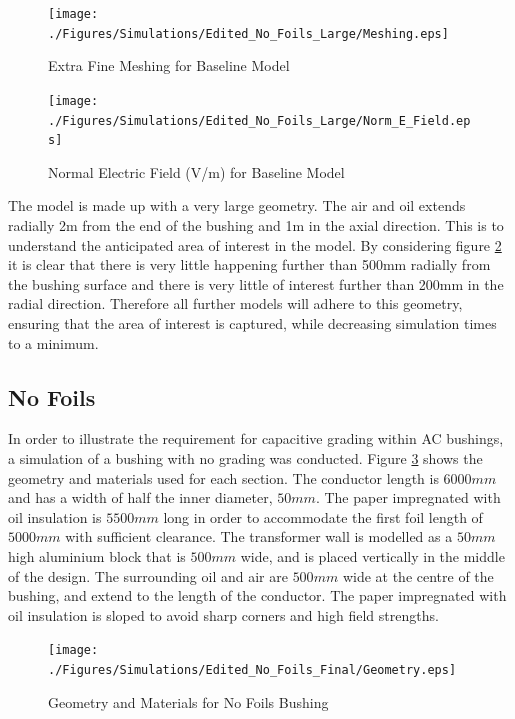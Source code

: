 \begin{figure}[!h]
  \centering
    \texttt{[image: ./Figures/Simulations/Edited\_No\_Foils\_Large/Meshing.eps]} 
\caption{Extra Fine Meshing for Baseline Model}
\label{Figure:No_Foil_Large_Mesh}
\end{figure}

\begin{figure}[!h]
  \centering
    \texttt{[image: ./Figures/Simulations/Edited\_No\_Foils\_Large/Norm\_E\_Field.eps]} 
\caption{Normal Electric Field (V/m) for Baseline Model}
\label{Figure:No_Foil_Large_Field}
\end{figure}

The model is made up with a very large geometry. 
The air and oil extends radially 2m from the end of the bushing and 1m in the axial direction.
This is to understand the anticipated area of interest in the model.
By considering figure \ref{Figure:No_Foil_Large_Field} it is clear that there is very little happening further than 500mm radially from the bushing surface and there is very little of interest further than 200mm in the radial direction.
Therefore all further models will adhere to this geometry, ensuring that the area of interest is captured, while decreasing simulation times to a minimum.

\subsection{No Foils}
In order to illustrate the requirement for capacitive grading within AC bushings, a simulation of a bushing with no grading was conducted.
Figure \ref{Figure:No_Foil_Geom} shows the geometry and materials used for each section.
The conductor length is $6000mm$ and has a width of half the inner diameter, $50mm$. 
The paper impregnated with oil insulation is $5500mm$ long in order to accommodate the first foil length of $5000mm$ with sufficient clearance. 
The transformer wall is modelled as a $50mm$ high aluminium block that is $500mm$ wide, and is placed vertically in the middle of the design. The surrounding oil and air are $500mm$ wide at the centre of the bushing, and extend to the length of the conductor.
The paper impregnated with oil insulation is sloped to avoid sharp corners and high field strengths.
\begin{figure}[!h]
  \centering
    \texttt{[image: ./Figures/Simulations/Edited\_No\_Foils\_Final/Geometry.eps]} 
	\caption{Geometry and Materials for No Foils Bushing}
\label{Figure:No_Foil_Geom}
\end{figure}


